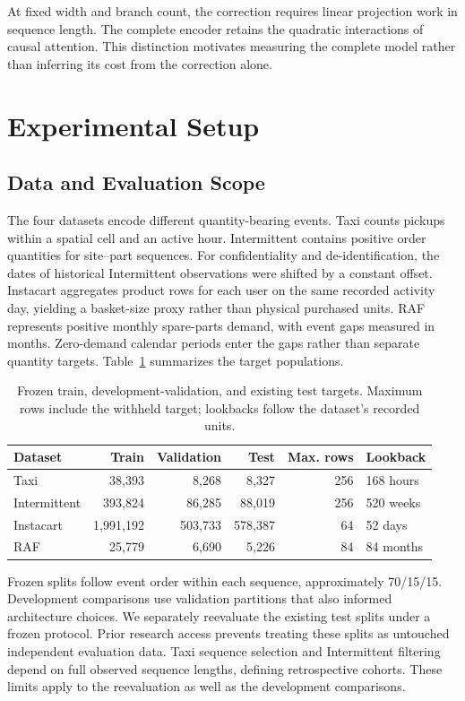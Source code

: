 \documentclass[runningheads]{llncs}
\begin{document}
At fixed width and branch count, the correction requires linear projection
work in sequence length. The complete encoder retains the quadratic
interactions of causal attention. This distinction motivates measuring the
complete model rather than inferring its cost from the correction alone.

\section{Experimental Setup}
\subsection{Data and Evaluation Scope}\label{sec:data-scope}
The four datasets encode different quantity-bearing events. Taxi counts
pickups within a spatial cell and an active hour. Intermittent contains
positive order quantities for site--part sequences. For confidentiality and
de-identification, the dates of historical Intermittent observations were
shifted by a constant offset. Instacart aggregates
product rows for each user on the same recorded activity day, yielding a
basket-size proxy rather than physical purchased units. RAF represents
positive monthly spare-parts demand, with event gaps measured in months.
Zero-demand calendar periods enter the gaps rather than separate quantity
targets. Table~\ref{tab:data} summarizes the target populations.

\begin{table}[t]
\caption{Frozen train, development-validation, and existing test targets. Maximum rows include the
withheld target; lookbacks follow the dataset's recorded units.}
\label{tab:data}\centering\small
\begin{tabular}{lrrrrl}
\toprule
Dataset & Train & Validation & Test & Max. rows & Lookback\\
\midrule
Taxi & 38,393 & 8,268 & 8,327 & 256 & 168 hours\\
Intermittent & 393,824 & 86,285 & 88,019 & 256 & 520 weeks\\
Instacart & 1,991,192 & 503,733 & 578,387 & 64 & 52 days\\
RAF & 25,779 & 6,690 & 5,226 & 84 & 84 months\\
\bottomrule
\end{tabular}
\end{table}

Frozen splits follow event order within each sequence, approximately
70/15/15. Development comparisons use validation partitions that also
informed architecture choices. We separately reevaluate the existing test
splits under a frozen protocol. Prior research access prevents treating
these splits as untouched independent evaluation data. Taxi sequence
selection and Intermittent filtering depend on full observed sequence
lengths, defining retrospective cohorts. These limits apply to the
reevaluation as well as the development comparisons.
\end{document}
